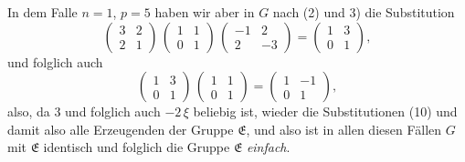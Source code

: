 \documentclass[12pt,a4paper]{article}
\begin{document}
In dem Falle $n = 1$, $p = 5$ haben wir aber in $G$ nach (2) und 3) die Substitution
\[
\begin{pmatrix}3&2\\2&1\end{pmatrix}\,
\begin{pmatrix}1&1\\0&1\end{pmatrix}\,
\begin{pmatrix}-1&2\\2&-3\end{pmatrix}
= \begin{pmatrix}1&3\\0&1\end{pmatrix},
\]
und folglich auch
\[
\begin{pmatrix}1&3\\0&1\end{pmatrix}\,
\begin{pmatrix}1&1\\0&1\end{pmatrix}
= \begin{pmatrix}1&-1\\0&1\end{pmatrix},
\]
also, da $3$ und folglich auch $-2\,\xi$ beliebig ist, wieder die Substitutionen (10) und damit also alle Erzeugenden der Gruppe $\mathfrak{E}$, und also ist in allen diesen Fällen $G$ mit $\mathfrak{E}$ identisch und folglich die Gruppe $\mathfrak{E}$ \emph{einfach}.
\end{document}
